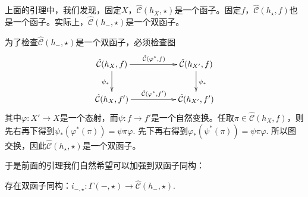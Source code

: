 



上面的引理中，我们发现，固定$X$，${\hat{\mathcal{C}}}(h_X,\star)$是一个函子。固定$f$，${\hat{\mathcal{C}}}(h_\star,f)$也是一个函子。实际上，${\hat{\mathcal{C}}}(h_-,\star)$是一个双函子。

为了检查${\hat{\mathcal{C}}}(h_-,\star)$是一个双函子，必须检查图
\[
\begin{xy}
	\xymatrix{
		\hat{\mathcal{C}}(h_{X},f)\ar[rr]^{\hat{\mathcal{C}}(\varphi^*,f)} \ar[d]_{\psi_*}&&\hat{\mathcal{C}}(h_{X'},f) \ar[d]^{\psi_*}\\
		\hat{\mathcal{C}}(h_{X},f')\ar[rr]^{\hat{\mathcal{C}}(\varphi^*,f')}&&\hat{\mathcal{C}}(h_{X'},f')
	}
\end{xy}
\]
其中$\varphi:X'\to X$是一个态射，而$\psi:f\to f'$是一个自然变换。任取$\pi\in \hat{\mathcal{C}}(h_{X},f)$，则先右再下得到$\psi_*(\varphi^*(\pi))=\psi\pi\varphi$. 先下再右得到$\varphi_*(\psi^*(\pi))=\psi\pi\varphi$. 所以图交换，因此${\hat{\mathcal{C}}}(h_\star,\star)$是一个双函子。

于是前面的引理我们自然希望可以加强到双函子同构：

\begin{pro}[Yoneda引理]
存在双函子同构：$i_{-,\star}:\Gamma(-,\star)\to {\hat{\mathcal{C}}}(h_-,\star)$.
\end{pro}

